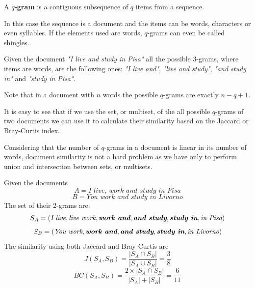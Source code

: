 \begin{definizione}
	A \textbf{$q$-gram} is a contiguous subsequence of $q$ items from a sequence.
\end{definizione}

In this case the sequence is a document and the items can be words, characters or even syllables. If the elements used are words, $q$-grams can even be called shingles.\medskip

\begin{esempio}
	Given the document \textit{"I live and study in Pisa"} all the possible $3$-grams, where items are words, are the following ones:
	\textit{"I live and"}, \textit{"live and study"}, \textit{"and study in"} and \textit{"study in Pisa"}.
\end{esempio}

Note that in a document with $n$ words the possible $q$-grams are exactly $n-q+1$.\medskip

It is easy to see that if we use the set, or multiset, of the all possible $q$-grams of two documents we can use it to calculate their similarity based on the Jaccard or Bray-Curtis index.\medskip

Considering that the number of $q$-grams in a document is linear in its number of words, document similarity is not a hard problem as we have only to perform union and intersection between sets, or multisets.\medskip

\begin{esempio}
	Given the documents 
	\begin{equation*}
	A = \textit{I live, work and study in Pisa}
	\end{equation*}
	\begin{equation*}
	B = \textit{You work and study in Livorno}
	\end{equation*}
	The set of their $2$-grams are:
	\begin{equation*}
	S_{A} = (\textit{I live}, \textit{live work}, \textit{\textbf{work and}}, \textit{\textbf{and study}}, \textit{\textbf{study in}}, \textit{in Pisa})
	\end{equation*}
	\begin{equation*}
	S_{B} = (\textit{You work}, \textit{\textbf{work and}}, \textit{\textbf{and study}}, \textit{\textbf{study in}}, \textit{in Livorno})
	\end{equation*}
	The similarity using both Jaccard and Bray-Curtis are\medskip
	\begin{equation*}
	J(S_{A},S_{B}) = \frac{|S_{A} \cap S_{B} |}{|S_{A} \cup S_{B} |} = \frac{3}{8}
	\end{equation*}
	\begin{equation*}
	BC(S_{A},S_{B}) = \frac{2 \times |S_{A} \cap S_{B} |}{|S_{A}| +|S_{B}|} = \frac{6}{11}
	\end{equation*}
\end{esempio}

